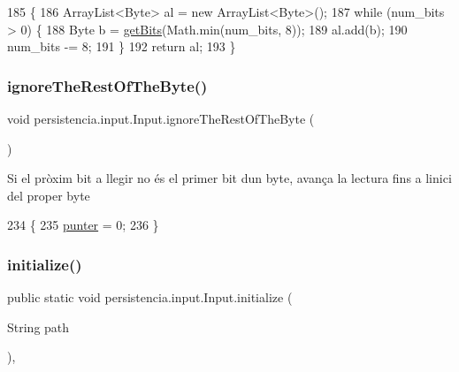 \begin{DoxyCode}
185     \{
186         ArrayList<Byte> al = \textcolor{keyword}{new} ArrayList<Byte>();
187         \textcolor{keywordflow}{while} (num\_bits > 0) \{
188             Byte b = \hyperlink{classpersistencia_1_1input_1_1Input_a3fa5a378b2155a3022a4a4ef38d63a8e}{getBits}(Math.min(num\_bits, 8));
189             al.add(b);
190             num\_bits -= 8;
191         \}
192         \textcolor{keywordflow}{return} al;
193     \}
\end{DoxyCode}
\mbox{\label{classpersistencia_1_1input_1_1Input_a2b9b57fce6cb83efe70d5dc205737249}} 
\subsubsection{\texorpdfstring{ignore\+The\+Rest\+Of\+The\+Byte()}{ignoreTheRestOfTheByte()}}
{\footnotesize\ttfamily void persistencia.\+input.\+Input.\+ignore\+The\+Rest\+Of\+The\+Byte (\begin{DoxyParamCaption}{ }\end{DoxyParamCaption})\hspace{0.3cm}{\ttfamily [inline]}}

Si el pròxim bit a llegir no és el primer bit d\textquotesingle{}un byte, avança la lectura fins a l\textquotesingle{}inici del proper byte 
\begin{DoxyCode}
234                                          \{
235         \hyperlink{classpersistencia_1_1input_1_1Input_abe76388d0ac9eeafdba673ad2138f8dc}{punter} = 0;
236     \}
\end{DoxyCode}
\mbox{\label{classpersistencia_1_1input_1_1Input_abe53dec7aca98b94d0ec5e3200483513}} 
\subsubsection{\texorpdfstring{initialize()}{initialize()}}
{\footnotesize\ttfamily public static void persistencia.\+input.\+Input.\+initialize (\begin{DoxyParamCaption}\item[{String}]{path }\end{DoxyParamCaption})\hspace{0.3cm}{\ttfamily [inline]}, {\ttfamily [static]}}



